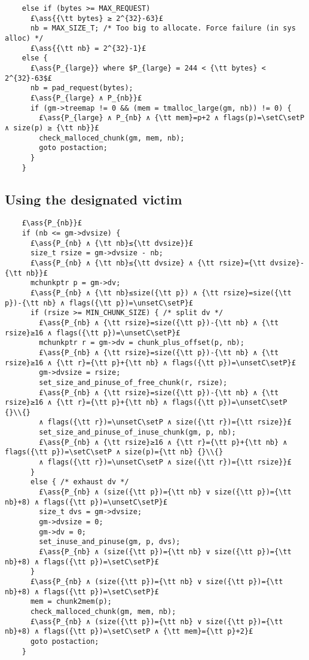 \documentclass[10pt,a4paper,twoside]{report}
\makeatletter
\newcommand{\ml}[2][t]{\mbox{\mdseries\begin{tabular}[#1]{@{}L@{}}#2\end{tabular}}}
\newcommand{\ass}[1]{\ensuremath{{\color{blue}\left\{\ml[c]{#1}\right\}}}}
\newcommand{\setC}{\raisebox{1.5pt}{$\blacktriangledown$}}
\newcommand{\unsetC}{\raisebox{1.5pt}{$\triangledown$}}
\newcommand{\setP}{{\blacktriangle}}
\makeatother
\begin{document}
\begin{lstlisting}
    else if (bytes >= MAX_REQUEST)
      £\ass{{\tt bytes} ≥ 2^{32}-63}£
      nb = MAX_SIZE_T; /* Too big to allocate. Force failure (in sys alloc) */
      £\ass{{\tt nb} = 2^{32}-1}£
    else {
      £\ass{P_{large}} where $P_{large} = 244 < {\tt bytes} < 2^{32}-63$£
      nb = pad_request(bytes);
      £\ass{P_{large} ∧ P_{nb}}£
      if (gm->treemap != 0 && (mem = tmalloc_large(gm, nb)) != 0) {
        £\ass{P_{large} ∧ P_{nb} ∧ {\tt mem}=p+2 ∧ flags(p)=\setC\setP ∧ size(p) ≥ {\tt nb}}£
        check_malloced_chunk(gm, mem, nb);
        goto postaction;
      }
    }
\end{lstlisting}

\subsection*{Using the designated victim}\label{sect:using_the_designated_victim}

\begin{lstlisting}
    £\ass{P_{nb}}£
    if (nb <= gm->dvsize) {
      £\ass{P_{nb} ∧ {\tt nb}≤{\tt dvsize}}£
      size_t rsize = gm->dvsize - nb;
      £\ass{P_{nb} ∧ {\tt nb}≤{\tt dvsize} ∧ {\tt rsize}={\tt dvsize}-{\tt nb}}£
      mchunkptr p = gm->dv;
      £\ass{P_{nb} ∧ {\tt nb}≤size({\tt p}) ∧ {\tt rsize}=size({\tt p})-{\tt nb} ∧ flags({\tt p})=\unsetC\setP}£
      if (rsize >= MIN_CHUNK_SIZE) { /* split dv */
        £\ass{P_{nb} ∧ {\tt rsize}=size({\tt p})-{\tt nb} ∧ {\tt rsize}≥16 ∧ flags({\tt p})=\unsetC\setP}£
        mchunkptr r = gm->dv = chunk_plus_offset(p, nb);
        £\ass{P_{nb} ∧ {\tt rsize}=size({\tt p})-{\tt nb} ∧ {\tt rsize}≥16 ∧ {\tt r}={\tt p}+{\tt nb} ∧ flags({\tt p})=\unsetC\setP}£
        gm->dvsize = rsize;
        set_size_and_pinuse_of_free_chunk(r, rsize);
        £\ass{P_{nb} ∧ {\tt rsize}=size({\tt p})-{\tt nb} ∧ {\tt rsize}≥16 ∧ {\tt r}={\tt p}+{\tt nb} ∧ flags({\tt p})=\unsetC\setP {}\\{}
        ∧ flags({\tt r})=\unsetC\setP ∧ size({\tt r})={\tt rsize}}£
        set_size_and_pinuse_of_inuse_chunk(gm, p, nb);
        £\ass{P_{nb} ∧ {\tt rsize}≥16 ∧ {\tt r}={\tt p}+{\tt nb} ∧ flags({\tt p})=\setC\setP ∧ size(p)={\tt nb} {}\\{}
        ∧ flags({\tt r})=\unsetC\setP ∧ size({\tt r})={\tt rsize}}£
      }
      else { /* exhaust dv */
        £\ass{P_{nb} ∧ (size({\tt p})={\tt nb} ∨ size({\tt p})={\tt nb}+8) ∧ flags({\tt p})=\unsetC\setP}£
        size_t dvs = gm->dvsize;
        gm->dvsize = 0;
        gm->dv = 0;
        set_inuse_and_pinuse(gm, p, dvs);
        £\ass{P_{nb} ∧ (size({\tt p})={\tt nb} ∨ size({\tt p})={\tt nb}+8) ∧ flags({\tt p})=\setC\setP}£
      }
      £\ass{P_{nb} ∧ (size({\tt p})={\tt nb} ∨ size({\tt p})={\tt nb}+8) ∧ flags({\tt p})=\setC\setP}£
      mem = chunk2mem(p);
      check_malloced_chunk(gm, mem, nb);
      £\ass{P_{nb} ∧ (size({\tt p})={\tt nb} ∨ size({\tt p})={\tt nb}+8) ∧ flags({\tt p})=\setC\setP ∧ {\tt mem}={\tt p}+2}£
      goto postaction;
    }
\end{lstlisting}
\end{document}
